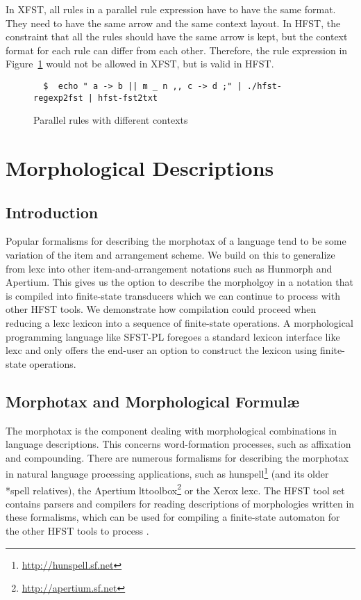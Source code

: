 \documentclass{llncs}
\begin{document}
In XFST, all rules in a parallel rule expression have to have the same format. 
They need to have the same arrow and the same context layout. 
In HFST, the constraint that all the rules should have the same arrow is kept, 
but the context format for each rule can differ from each other. 
Therefore, the rule expression in Figure~\ref{fig:parallel_rules} 
would not be allowed in XFST, but is valid in HFST.
\begin{figure}
\begin{verbatim}
  $  echo " a -> b || m _ n ,, c -> d ;" | ./hfst-regexp2fst | hfst-fst2txt
\end{verbatim}
\caption{Parallel rules with different contexts}
\label{fig:parallel_rules}
\end{figure}

\section{Morphological Descriptions}\label{MorphTools}

\subsection{Introduction}

Popular formalisms for describing the morphotax of a language tend to be some variation 
of the item and arrangement scheme. We build on this to generalize from lexc into other 
item-and-arrangement notations such as  Hunmorph and Apertium. This gives us the option to describe 
the morpholgoy in a notation that is compiled into finite-state transducers which we can continue to process with other
HFST tools. We demonstrate how compilation could proceed when reducing a lexc lexicon into a sequence of
finite-state operations. A morphological programming language like SFST-PL foregoes a standard lexicon interface
like lexc and only offers the end-user an option to construct the lexicon using finite-state operations.

\subsection{Morphotax and Morphological Formul\ae}

The morphotax is the component dealing with morphological combinations
in language descriptions. This concerns word-formation processes, such as affixation and compounding. 
There are numerous formalisms for describing the morphotax in natural language processing applications, 
such as hunspell\footnote{\url{http://hunspell.sf.net}} (and its older *spell relatives),
the Apertium lttoolbox\footnote{\url{http://apertium.sf.net}}
or the Xerox lexc\cite{beesley/2003}. The HFST tool set contains parsers and compilers 
for reading descriptions of morphologies written in these formalisms, which can be used for 
compiling a finite-state automaton for the other HFST tools to process 
\cite{pirinen/2010/il,linden/2009/sfcm}.
\end{document}
